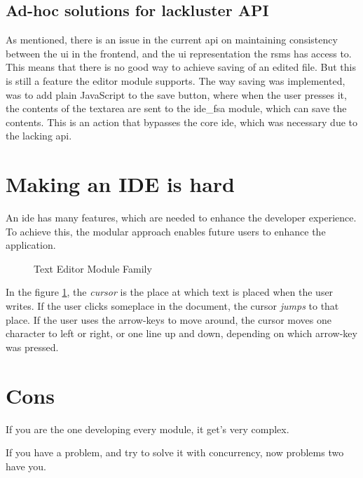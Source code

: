 \subsection{Ad-hoc solutions for lackluster API}

As mentioned, there is an issue in the current \gls{api} on maintaining
consistency between the \gls{ui} in the frontend, and the \gls{ui}
representation the \gls{rsms} has access to. This means that there is no
good way to achieve saving of an edited file. But this is still a feature the
editor module supports. The way saving was implemented, was to add plain
JavaScript to the save button, where when the user presses it, the contents
of the textarea are sent to the \gls{ide}\_fsa module, which can save the
contents. This is an action that bypasses the core \gls{ide}, which was
necessary due to the lacking \gls{api}.

\section{Making an IDE is hard}

An \gls{ide} has many features, which are needed to enhance the developer
experience. To achieve this, the modular approach enables future users to
enhance the application.

\begin{figure}
  \centering
  
  \caption{Text Editor Module Family}
  \label{fig:extendedModuleFamily}
\end{figure}

In the figure \ref{fig:extendedModuleFamily}, the \textit{cursor} is the place
at which text is placed when the user writes. If the user clicks someplace in
the document, the cursor \textit{jumps} to that place. If the user uses the
arrow-keys to move around, the cursor moves one character to left or right, or
one line up and down, depending on which arrow-key was pressed.

\section{Cons}

If you are the one developing every module, it get's very complex.

If you have a problem, and try to solve it with concurrency, now problems two
have you.
